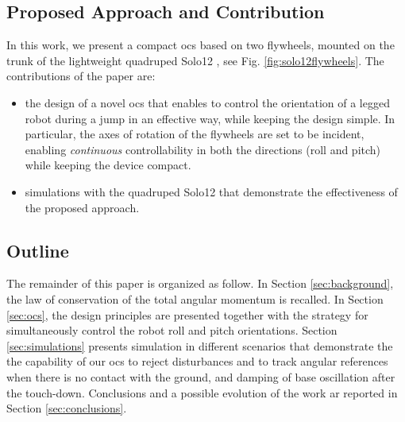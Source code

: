 \documentclass[letterpaper, 10 pt, conference]{ieeeconf}      %
\begin{document}
\subsection{Proposed Approach and Contribution}
In this work, we present a compact \gls{ocs} based on two flywheels, mounted on the trunk of the lightweight quadruped Solo12 \cite{grimminger2020open}, see Fig. \ref{fig:solo12flywheels}.
The contributions of the paper are:
\begin{itemize}
	\item the design of a novel \gls{ocs} that enables to control the orientation of a legged robot during a jump in an effective way, while keeping the design simple. 
	In particular,  the axes of rotation of the flywheels are set to be incident, enabling \textit{continuous} controllability in both the directions (roll and pitch) while keeping the  device compact.
	\item simulations  with the quadruped Solo12 that demonstrate the effectiveness of the proposed approach.
\end{itemize}



\subsection{Outline}
The remainder of this paper is organized as follow. In Section \ref{sec:background}, the law of conservation of the total angular momentum is recalled. In Section \ref{sec:ocs}, the design principles are presented together with the strategy for simultaneously control the robot roll and pitch orientations. Section \ref{sec:simulations} presents simulation in different scenarios that demonstrate the the capability of our \gls{ocs} to reject disturbances and to track angular references when there is no contact with the ground, and damping of base oscillation after the touch-down. Conclusions and a possible evolution of the work ar reported in Section \ref{sec:conclusions}.
% 
\end{document}

